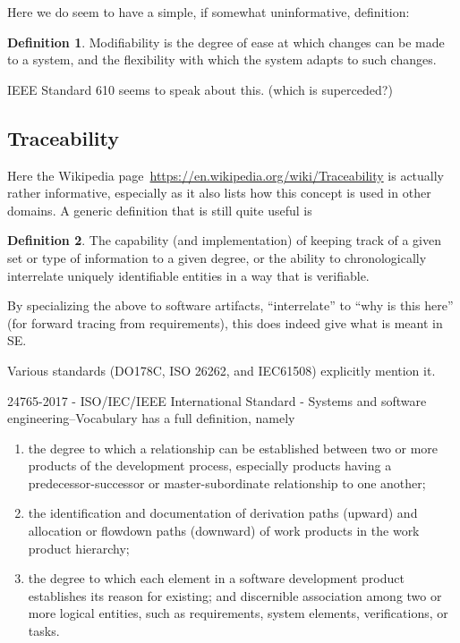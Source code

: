 \documentclass[letterpaper,cleveref]{lipics-v2019}
\theoremstyle{definition}
\newtheorem{defn}{Definition}
\begin{document}
Here we do seem to have a simple, if somewhat uninformative, definition:

\begin{defn}
Modifiability is the degree of ease at which changes can be made to a system,
and the flexibility with which the system adapts to such changes.
\end{defn}

IEEE Standard 610 seems to speak about this. (which is superceded?)

\subsection{Traceability}

Here the Wikipedia page~\url{https://en.wikipedia.org/wiki/Traceability} is actually
rather informative, especially as it also lists how this concept is used in other domains.
A generic definition that is still quite useful is
\begin{defn}
The capability (and implementation) of keeping track of a given set or type of
information to a given degree, or the ability to chronologically interrelate
uniquely identifiable entities in a way that is verifiable.
\end{defn}
By specializing the above to software artifacts, ``interrelate'' to 
``why is this here'' (for forward tracing from requirements), this does
indeed give what is meant in SE.

Various standards (DO178C, ISO 26262, and IEC61508) explicitly mention it.

24765-2017 - ISO/IEC/IEEE International Standard - Systems and software engineering--Vocabulary
has a full definition, namely
\begin{enumerate}
\item the degree to which a relationship can be established between two or more
products of the development process, especially products having a
predecessor-successor or master-subordinate relationship to one another;
\item
the identification and documentation of derivation paths (upward) and
allocation or flowdown paths (downward) of work products in the work product
hierarchy;
\item the degree to which each element in a software development
product establishes its reason for existing; and discernible association
among two or more logical entities, such as requirements, system elements,
verifications, or tasks.
\end{enumerate}
\end{document}
